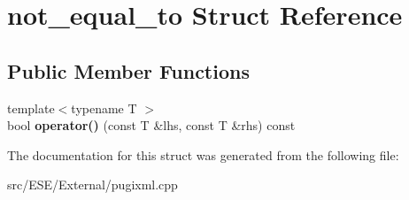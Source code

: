 \hypertarget{structnot__equal__to}{\section{not\-\_\-equal\-\_\-to Struct Reference}
\label{structnot__equal__to}
}
\subsection*{Public Member Functions}
\begin{DoxyCompactItemize}
\item 
\hypertarget{structnot__equal__to_acbcb7d0809378458b52e6ed1a07c1d7d}{{\footnotesize template$<$typename T $>$ }\\bool {\bfseries operator()} (const T \&lhs, const T \&rhs) const }\label{structnot__equal__to_acbcb7d0809378458b52e6ed1a07c1d7d}

\end{DoxyCompactItemize}


The documentation for this struct was generated from the following file\-:\begin{DoxyCompactItemize}
\item 
src/\-E\-S\-E/\-External/pugixml.\-cpp\end{DoxyCompactItemize}
